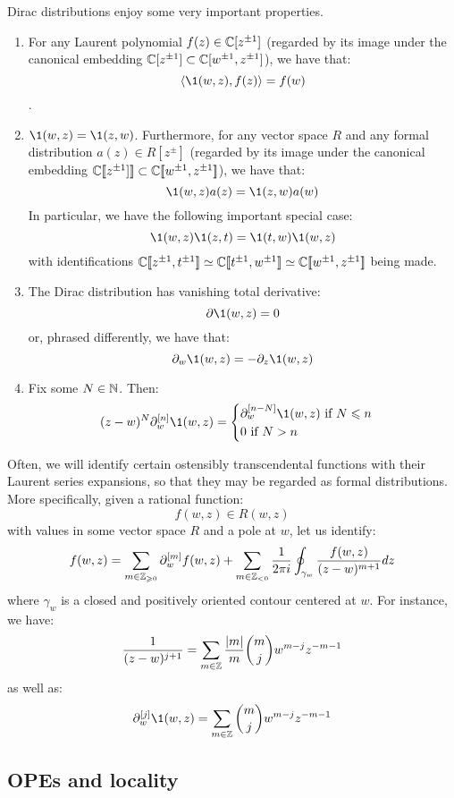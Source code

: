         \begin{lemma} \label{lemma: basic_properties_of_dirac_distributions}
            Dirac distributions enjoy some very important properties.
            \begin{enumerate}
                \item For any Laurent polynomial $f(z) \in \mathbb{C}[z^{\pm 1}]$ (regarded by its image under the canonical embedding $\mathbb{C}[z^{\pm 1}] \subset \mathbb{C}[w^{\pm 1}, z^{\pm 1}]$), we have that:
                    $$\< \1(w, z), f(z) \> = f(w)$$.
                \item $\1(w, z) = \1(z, w)$. Furthermore, for any vector space $R$ and any formal distribution $a(z) \in R[z^{\pm}]$ (regarded by its image under the canonical embedding $\mathbb{C}[\![z^{\pm 1}]]\!] \subset \mathbb{C}[\![w^{\pm 1}, z^{\pm 1}]\!]$), we have that:
                    $$\1(w, z) a(z) = \1(z, w) a(w)$$
                In particular, we have the following important special case:
                    $$\1(w, z) \1(z, t) = \1(t, w) \1(w, z)$$
                with identifications $\mathbb{C}[\![z^{\pm 1}, t^{\pm 1}]\!] \simeq \mathbb{C}[\![t^{\pm 1}, w^{\pm 1}]\!] \simeq \mathbb{C}[\![w^{\pm 1}, z^{\pm 1}]\!]$ being made.
                \item The Dirac distribution has vanishing total derivative:
                    $$\del \1(w, z) = 0$$
                or, phrased differently, we have that:
                    $$\del_w \1(w, z) = -\del_z \1(w, z)$$
                \item Fix some $N \in \mathbb{N}$. Then:
                    $$
                        (z - w)^N \del_w^{[n]} \1(w, z) =
                        \begin{cases}
                            \text{$\del_w^{[n - N]} \1(w, z)$ if $N \leq n$}
                            \\
                            \text{$0$ if $N > n$}
                        \end{cases}
                    $$
            \end{enumerate}
        \end{lemma}

        Often, we will identify certain ostensibly transcendental functions with their Laurent series expansions, so that they may be regarded as formal distributions. More specifically, given a rational function:
            $$f(w, z) \in R(w, z)$$
        with values in some vector space $R$ and a  pole at $w$, let us identify:
            $$f(w, z) = \sum_{m \in \mathbb{Z}_{\geqslant 0}} \partial_w^{[m]} f(w, z) + \sum_{m \in \mathbb{Z}_{< 0}} \frac{1}{2\pi i} \oint_{\gamma_w} \frac{f(w, z)}{(z - w)^{m + 1}} dz$$
        where $\gamma_w$ is a closed and positively oriented contour centered at $w$. For instance, we have:
            $$\frac{1}{(z - w)^{j + 1}} = \sum_{m \in \mathbb{Z}} \frac{|m|}{m} \binom{m}{j} w^{m - j} z^{-m - 1}$$
        as well as:
            $$\del_w^{[j]} \1(w, z) = \sum_{m \in \Z} \binom{m}{j} w^{m - j} z^{-m - 1}$$

    \subsection{OPEs and locality}
        \begin{definition}[Locality] \label{def: locality}
            
        \end{definition}